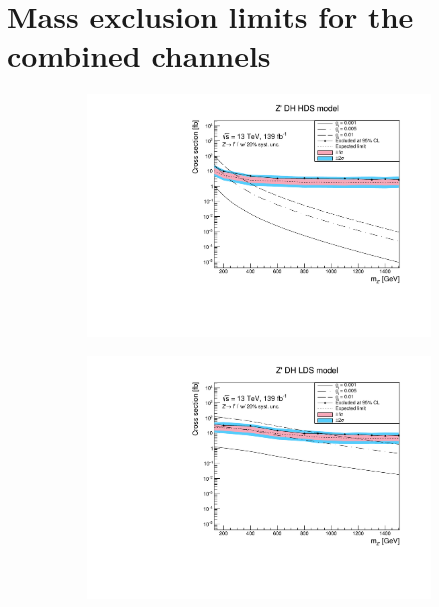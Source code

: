\documentclass[14pt, a4paper]{book}
\begin{document}
\section{Mass exclusion limits for the combined channels}
\begin{figure}[!ht]
	\centering
	\begin{subfigure}[b]{0.49\textwidth}
      \centering
      \includegraphics[width=1\textwidth]{Limits/DH_HDS/mass_exclusion_comb.pdf}
   \end{subfigure}
   \hfill
   \begin{subfigure}[b]{0.49\textwidth}
      \centering
      \includegraphics[width=1\textwidth]{Limits/DH_LDS/mass_exclusion_comb.pdf}
   \end{subfigure}

\end{figure}
\end{document}
